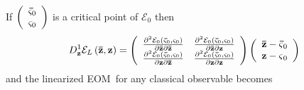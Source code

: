 \documentclass[aps,preprint]{revtex4}%
\begin{document}
If $\left(
\begin{array}
[c]{c}%
\mathbf{\bar{\varsigma}}_{0}\\
\mathbf{\varsigma}_{0}%
\end{array}
\right)  $ is a critical point of $\mathcal{E}_{0}$ then
\begin{equation}
D_{\mathbf{z}}^{1}\mathcal{E}_{L}\left(  \mathbf{\bar{z}},\mathbf{z}\right)
=\left(
\begin{array}
[c]{cc}%
\frac{\partial^{2}\mathcal{E}_{0}\left(  \mathbf{\bar{\varsigma}}%
_{0},\mathbf{\varsigma}_{0}\right)  }{\partial\mathbf{\bar{z}}\partial
\mathbf{\bar{z}}} & \frac{\partial^{2}\mathcal{E}_{0}\left(  \mathbf{\bar
{\varsigma}}_{0},\mathbf{\varsigma}_{0}\right)  }{\partial\mathbf{\bar{z}%
}\partial\mathbf{z}}\\
\frac{\partial^{2}\mathcal{E}_{0}\left(  \mathbf{\bar{\varsigma}}%
_{0},\mathbf{\varsigma}_{0}\right)  }{\partial\mathbf{z}\partial
\mathbf{\bar{z}}} & \frac{\partial^{2}\mathcal{E}_{0}\left(  \mathbf{\bar
{\varsigma}}_{0},\mathbf{\varsigma}_{0}\right)  }{\partial\mathbf{z}%
\partial\mathbf{z}}%
\end{array}
\right)  \left(
\begin{array}
[c]{c}%
\mathbf{\bar{z}-\bar{\varsigma}}_{0}\\
\mathbf{z-\varsigma}_{0}%
\end{array}
\right)
\end{equation}
and the linearized EOM\ for any classical observable becomes
\end{document}
